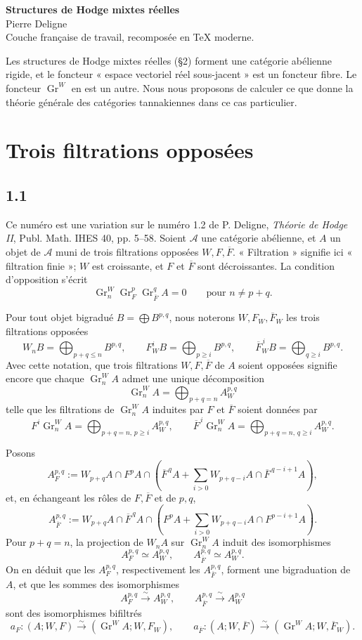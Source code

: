 \documentclass[11pt]{article}
\newcommand{\Gr}{\operatorname{Gr}}
\begin{document}
\begin{center}
 {\Large\bfseries Structures de Hodge mixtes réelles}\\[0.7em]
 {\large Pierre Deligne}\\[0.4em]
 {\small Couche française de travail, recomposée en TeX moderne.}
\end{center}

Les structures de Hodge mixtes réelles (§2) forment une catégorie abélienne rigide, et le foncteur « espace vectoriel réel sous-jacent » est un foncteur fibre. Le foncteur \(\Gr^W\) en est un autre. Nous nous proposons de calculer ce que donne la théorie générale des catégories tannakiennes dans ce cas particulier.

\section{Trois filtrations opposées}

\subsection*{1.1}
Ce numéro est une variation sur le numéro 1.2 de P. Deligne, \emph{Théorie de Hodge II}, Publ. Math. IHES 40, pp. 5--58. Soient \(\mathcal A\) une catégorie abélienne, et \(A\) un objet de \(\mathcal A\) muni de trois filtrations opposées \(W,F,\overline F\). « Filtration » signifie ici « filtration finie »; \(W\) est croissante, et \(F\) et \(\overline F\) sont décroissantes. La condition d'opposition s'écrit
\[
   \Gr^W_n\Gr^p_F\Gr^q_{\overline F} A=0
   \qquad\text{pour } n\ne p+q .
\]

Pour tout objet bigradué \(B=\bigoplus B^{p,q}\), nous noterons \(W,F_W,\overline F_W\) les trois filtrations opposées
\[
 W_nB=\bigoplus_{p+q\le n}B^{p,q},\qquad
 F_W^iB=\bigoplus_{p\ge i}B^{p,q},\qquad
 \overline F_W^{\,i}B=\bigoplus_{q\ge i}B^{p,q}.
\]
Avec cette notation, que trois filtrations \(W,F,\overline F\) de \(A\) soient opposées signifie encore que chaque \(\Gr^W_nA\) admet une unique décomposition
\[
   \Gr^W_nA=\bigoplus_{p+q=n} A_W^{p,q}
\]
telle que les filtrations de \(\Gr^W_nA\) induites par \(F\) et \(\overline F\) soient données par
\[
 F^i\Gr^W_nA=\bigoplus_{p+q=n,\,p\ge i}A_W^{p,q},\qquad
 \overline F^{\,i}\Gr^W_nA=\bigoplus_{p+q=n,\,q\ge i}A_W^{p,q}.
\]

Posons
\[
 A_F^{p,q}:=W_{p+q}A\cap F^pA\cap
 \left(\overline F^{\,q}A+\sum_{i>0}W_{p+q-i}A\cap \overline F^{\,q-i+1}A\right),
\]
et, en échangeant les rôles de \(F,\overline F\) et de \(p,q\),
\[
 A_{\overline F}^{p,q}:=W_{p+q}A\cap \overline F^{\,q}A\cap
 \left(F^pA+\sum_{i>0}W_{p+q-i}A\cap F^{p-i+1}A\right).
\]
Pour \(p+q=n\), la projection de \(W_nA\) sur \(\Gr^W_nA\) induit des isomorphismes
\[
 A_F^{p,q}\simeq A_W^{p,q},\qquad
 A_{\overline F}^{p,q}\simeq A_W^{p,q}.
\]
On en déduit que les \(A_F^{p,q}\), respectivement les \(A_{\overline F}^{p,q}\), forment une bigraduation de \(A\), et que les sommes des isomorphismes
\[
 A_F^{p,q}\xrightarrow{\sim}A_W^{p,q},\qquad
 A_{\overline F}^{p,q}\xrightarrow{\sim}A_W^{p,q}
\]
sont des isomorphismes bifiltrés
\[
 a_F:(A;W,F)\xrightarrow{\sim}(\Gr^WA;W,F_W),
 \qquad
 a_{\overline F}:(A;W,\overline F)\xrightarrow{\sim}(\Gr^WA;W,\overline F_W).
\]
\end{document}
